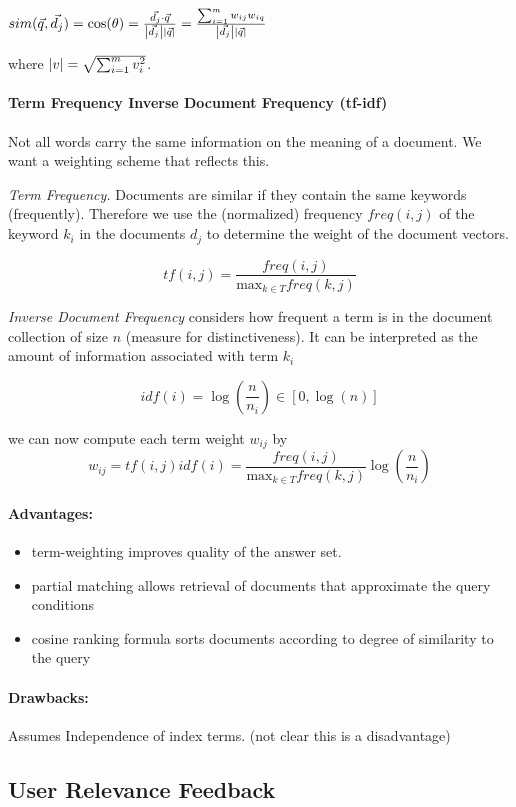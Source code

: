 $sim(\vec{q}, \vec{d_j}) = \cos(\theta)= \frac{\vec{d_j} \cdot \vec{q}}{\left| \vec{d_j} \right|\left| \vec{q} \right|}= \frac{\sum_{i=1}^m w_{ij}w_{iq}}{\left| \vec{d_j} \right|\left| \vec{q} \right|}$


where $\left| v \right| = \sqrt{\sum_{i=1}^m v_i^2}$.

\paragraph{Term Frequency Inverse Document Frequency (tf-idf)} Not all words carry the same information on the meaning of a document. We want a weighting scheme that reflects this.

\textit{Term Frequency.} Documents are similar if they contain the same keywords (frequently). Therefore we use the (normalized) frequency $freq(i,j)$ of the keyword $k_i$ in the documents $d_j$ to determine the weight of the document vectors.

\[tf(i,j) = \frac{freq(i,j)}{\text{max}_{k \in T}freq(k,j)}\]

\textit{Inverse Document Frequency} considers how frequent a term is in the document collection of size $n$ (measure for distinctiveness). It can be interpreted as the amount of information associated with term $k_i$

\[idf(i)= \log(\frac{n}{n_i}) \in [0,\log(n)]\]

we can now compute each term weight $w_{ij}$ by
\[w_{ij} = tf(i,j)idf(i) = \frac{freq(i,j)}{\text{max}_{k \in T}freq(k,j)} \log(\frac{n}{n_i})\]


\paragraph{Advantages:}
\begin{itemize}
\item term-weighting improves quality of the answer set. 
\item partial matching allows retrieval of documents that approximate the query conditions
\item cosine ranking formula sorts documents according to degree of similarity to the query
\end{itemize} 
\paragraph{Drawbacks:} Assumes Independence of index terms. (not clear this is a disadvantage)
\subsection{User Relevance Feedback}

